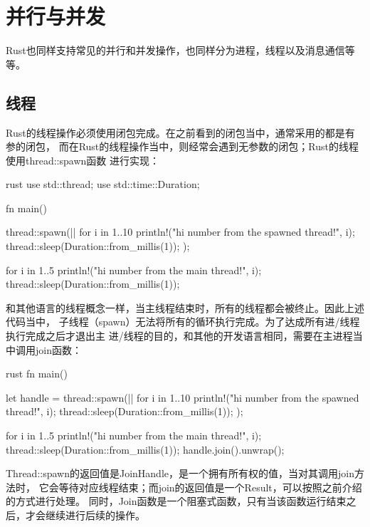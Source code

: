 \section{并行与并发}
Rust也同样支持常见的并行和并发操作，也同样分为进程，线程以及消息通信等等。

\subsection{线程}
Rust的线程操作必须使用闭包完成。在之前看到的闭包当中，通常采用的都是有参的闭包，
而在Rust的线程操作当中，则经常会遇到无参数的闭包；Rust的线程使用thread::spawn函数
进行实现：
\begin{code-block}{rust}
use std::thread;
use std::time::Duration;

fn main() {
    thread::spawn(|| {
        for i in 1..10 {
            println!("hi number {} from the spawned thread!", i);
            thread::sleep(Duration::from_millis(1));
        }
    });

    for i in 1..5 {
        println!("hi number {} from the main thread!", i);
        thread::sleep(Duration::from_millis(1));
    }
}
\end{code-block}
和其他语言的线程概念一样，当主线程结束时，所有的线程都会被终止。因此上述代码当中，
子线程（spawn）无法将所有的循环执行完成。为了达成所有进/线程执行完成之后才退出主
进/线程的目的，和其他的开发语言相同，需要在主进程当中调用join函数：
\begin{code-block}{rust}
fn main() {
    let handle = thread::spawn(|| {
        for i in 1..10 {
            println!("hi number {} from the spawned thread!", i);
            thread::sleep(Duration::from_millis(1));
        }
    });

    for i in 1..5 {
        println!("hi number {} from the main thread!", i);
        thread::sleep(Duration::from_millis(1));
    }
    handle.join().unwrap();
}
\end{code-block}
Thread::spawn的返回值是JoinHandle，是一个拥有所有权的值，当对其调用join方法时，
它会等待对应线程结束；而join的返回值是一个Result，可以按照之前介绍的方式进行处理。
同时，Join函数是一个阻塞式函数，只有当该函数运行结束之后，才会继续进行后续的操作。

